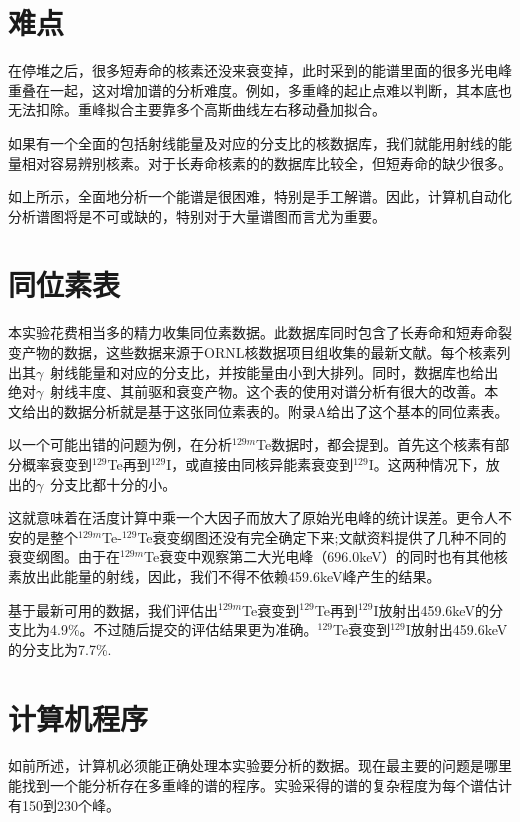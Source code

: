 \section{难点}
在停堆之后，很多短寿命的核素还没来衰变掉，此时采到的能谱里面的很多光电峰重叠在一起，这对增加谱的分析难度。例如，多重峰的起止点难以判断，其本底也无法扣除。重峰拟合主要靠多个高斯曲线左右移动叠加拟合。

如果有一个全面的包括射线能量及对应的分支比的核数据库，我们就能用射线的能量相对容易辨别核素。对于长寿命核素的的数据库比较全，但短寿命的缺少很多。

如上所示，全面地分析一个能谱是很困难，特别是手工解谱。因此，计算机自动化分析谱图将是不可或缺的，特别对于大量谱图而言尤为重要。

\section{同位素表}

本实验花费相当多的精力收集同位素数据。此数据库同时包含了长寿命和短寿命裂变产物的数据，这些数据来源于ORNL核数据项目组收集的最新文献。每个核素列出其$\gamma$\ 射线能量和对应的分支比，并按能量由小到大排列。同时，数据库也给出绝对$\gamma$\ 射线丰度、其前驱和衰变产物。这个表的使用对谱分析有很大的改善。本文给出的数据分析就是基于这张同位素表的。附录A给出了这个基本的同位素表。

以一个可能出错的问题为例，在分析$^{129m}$Te数据时，都会提到。首先这个核素有部分概率衰变到$^{129}$Te再到$^{129}$I，或直接由同核异能素衰变到$^{129}$I。这两种情况下，放出的$\gamma$\ 分支比都十分的小。

这就意味着在活度计算中乘一个大因子而放大了原始光电峰的统计误差。更令人不安的是整个$^{129m}$Te-$^{129}$Te衰变纲图还没有完全确定下来;文献资料提供了几种不同的衰变纲图。由于在$^{129m}$Te衰变中观察第二大光电峰（696.0keV）的同时也有其他核素放出此能量的射线，因此，我们不得不依赖459.6keV峰产生的结果。

基于最新可用的数据，我们评估出$^{129m}$Te衰变到$^{129}$Te再到$^{129}$I放射出459.6keV的分支比为4.9\%。不过随后提交的评估结果更为准确。$^{129}$Te衰变到$^{129}$I放射出459.6keV的分支比为7.7\%.

\section{计算机程序}

如前所述，计算机必须能正确处理本实验要分析的数据。现在最主要的问题是哪里能找到一个能分析存在多重峰的谱的程序。实验采得的谱的复杂程度为每个谱估计有150到230个峰。

